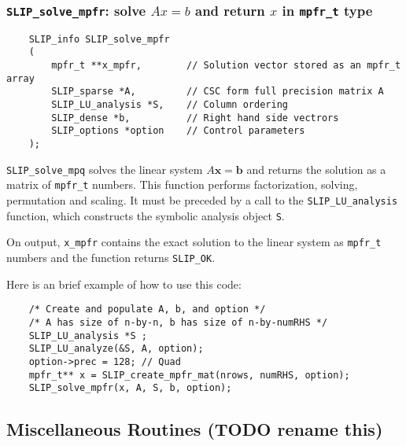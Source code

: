 \documentclass[12pt]{article}
\theoremstyle{definition}
\begin{document}
\cprotect\subsubsection{\verb|SLIP_solve_mpfr|: solve $Ax=b$ and return $x$ in \verb|mpfr_t| type}
\label{ss:SLIP_solve_mpfr}

\begin{mdframed}[userdefinedwidth=6in]
{\footnotesize
\begin{verbatim}
    SLIP_info SLIP_solve_mpfr
    (
        mpfr_t **x_mpfr,        // Solution vector stored as an mpfr_t array
        SLIP_sparse *A,         // CSC form full precision matrix A
        SLIP_LU_analysis *S,    // Column ordering
        SLIP_dense *b,          // Right hand side vectrors
        SLIP_options *option    // Control parameters
    );
\end{verbatim}
} \end{mdframed}


\verb|SLIP_solve_mpq| solves the linear system $A\mathbf{x}=\mathbf{b}$ and
returns the solution as a matrix of \verb|mpfr_t| numbers. This function
performs factorization, solving, permutation and scaling.  It must be preceded
by a call to the \verb|SLIP_LU_analysis| function, which constructs the
symbolic analysis object \verb|S|.

On output, \verb|x_mpfr| contains the exact solution to the linear system
as \verb|mpfr_t| numbers and the function returns \verb|SLIP_OK|.

Here is an brief example of how to use this code:

{\small
\begin{verbatim}
    /* Create and populate A, b, and option */
    /* A has size of n-by-n, b has size of n-by-numRHS */
    SLIP_LU_analysis *S ;
    SLIP_LU_analyze(&S, A, option);
    option->prec = 128; // Quad
    mpfr_t** x = SLIP_create_mpfr_mat(nrows, numRHS, option);
    SLIP_solve_mpfr(x, A, S, b, option);
\end{verbatim}
}

\subsection{Miscellaneous Routines (TODO rename this)}
\label{s:miscellaneous_routine}
\end{document}
